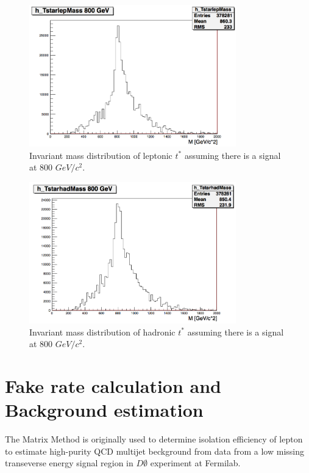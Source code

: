 \documentclass[12pt,oneandhalf,chaparabic,phys,ms,eng]{metu}
\begin{document}
\begin{figure}[!h]
\centering
    \includegraphics[width=0.8\textwidth]{tstarlep}
    \caption{\label{tstarlep} Invariant mass distribution of leptonic $t^*$  assuming there is a signal at 800 $GeV/c^2$.}
\end{figure}

\begin{figure}[!h]
\centering
    \includegraphics[width=0.8\textwidth]{tstarhad}
    \caption{\label{tstarhad} Invariant mass distribution of hadronic $t^*$  assuming there is a signal at 800 $GeV/c^2$.}
\end{figure}




\section{Fake rate calculation and Background estimation}

The Matrix Method is originally used to determine isolation efficiency of lepton to estimate high-purity QCD multijet beckground from data from a low missing transeverse energy signal region in  $D \emptyset$ experiment at Fermilab.
\end{document}
